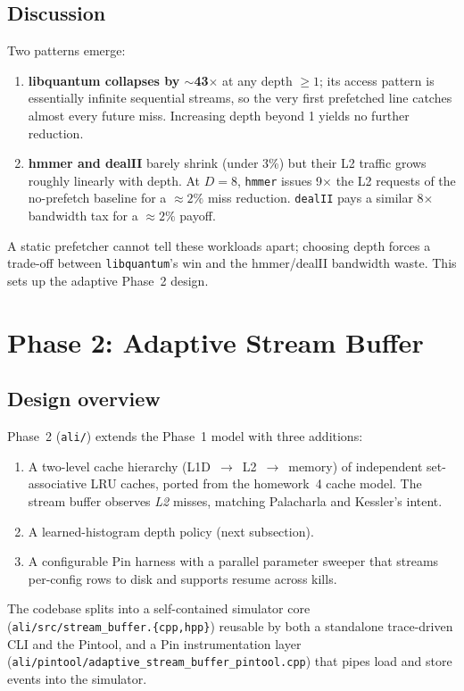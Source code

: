 \documentclass[11pt,letterpaper]{article}
\begin{document}
\subsection{Discussion}
Two patterns emerge:
\begin{enumerate}
  \item \textbf{libquantum collapses by $\sim$43$\times$} at any depth
        $\geq 1$; its access pattern is essentially infinite sequential
        streams, so the very first prefetched line catches almost every
        future miss. Increasing depth beyond 1 yields no further reduction.
  \item \textbf{hmmer and dealII} barely shrink (under 3\%) but their L2
        traffic grows roughly linearly with depth. At $D=8$, \texttt{hmmer}
        issues 9$\times$ the L2 requests of the no-prefetch baseline for a
        $\approx2\%$ miss reduction. \texttt{dealII} pays a similar 8$\times$
        bandwidth tax for a $\approx2\%$ payoff.
\end{enumerate}
A static prefetcher cannot tell these workloads apart; choosing depth
forces a trade-off between \texttt{libquantum}'s win and the
hmmer/dealII bandwidth waste. This sets up the adaptive Phase~2 design.

\section{Phase 2: Adaptive Stream Buffer}
\label{sec:phase2}

\subsection{Design overview}
Phase~2 (\texttt{ali/}) extends the Phase~1 model with three additions:
\begin{enumerate}
  \item A two-level cache hierarchy (L1D~$\rightarrow$~L2~$\rightarrow$~memory)
        of independent set-associative LRU caches, ported from the homework~4
        cache model. The stream buffer observes \emph{L2} misses, matching
        Palacharla and Kessler's intent.
  \item A learned-histogram depth policy (next subsection).
  \item A configurable Pin harness with a parallel parameter sweeper that
        streams per-config rows to disk and supports resume across kills.
\end{enumerate}
The codebase splits into a self-contained simulator core
(\texttt{ali/src/stream\_buffer.\{cpp,hpp\}}) reusable by both a standalone
trace-driven CLI and the Pintool, and a Pin instrumentation layer
(\texttt{ali/pintool/adaptive\_stream\_buffer\_pintool.cpp}) that pipes load
and store events into the simulator.
\end{document}
